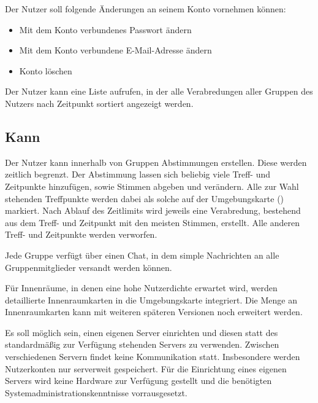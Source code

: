\documentclass[parskip=full,11pt]{scrartcl}
\begin{document}
Der Nutzer soll folgende Änderungen an seinem Konto vornehmen können:
\begin{itemize}
    \item Mit dem Konto verbundenes Passwort ändern
    \item Mit dem Konto verbundene E-Mail-Adresse ändern
    \item Konto löschen
\end{itemize}

Der Nutzer kann eine Liste aufrufen, in der alle Verabredungen aller Gruppen
des Nutzers nach Zeitpunkt sortiert angezeigt werden.

\subsection{Kann}

Der Nutzer kann innerhalb von Gruppen Abstimmungen erstellen.
Diese werden zeitlich begrenzt.
Der Abstimmung lassen sich beliebig viele Treff- und Zeitpunkte hinzufügen,
sowie Stimmen abgeben und verändern.
Alle zur Wahl stehenden Treffpunkte werden dabei als solche auf der
Umgebungskarte () markiert.
Nach Ablauf des Zeitlimits wird jeweils eine Verabredung, bestehend aus dem
Treff- und Zeitpunkt mit den meisten Stimmen, erstellt.
Alle anderen Treff- und Zeitpunkte werden verworfen.

Jede Gruppe verfügt über einen Chat, in dem simple Nachrichten an alle
Gruppenmitglieder versandt werden können.

Für Innenräume, in denen eine hohe Nutzerdichte erwartet wird, werden
detaillierte Innenraumkarten in die Umgebungskarte integriert. Die Menge an
Innenraumkarten kann mit weiteren späteren Versionen noch erweitert werden.

Es soll möglich sein, einen eigenen Server einrichten und diesen statt des
standardmäßig zur Verfügung stehenden Servers zu verwenden.
Zwischen verschiedenen Servern findet keine Kommunikation statt.
Insbesondere werden Nutzerkonten nur serverweit gespeichert.
Für die Einrichtung eines eigenen Servers wird keine Hardware zur Verfügung
gestellt und die benötigten Systemadministrationskenntnisse vorrausgesetzt.
\end{document}
